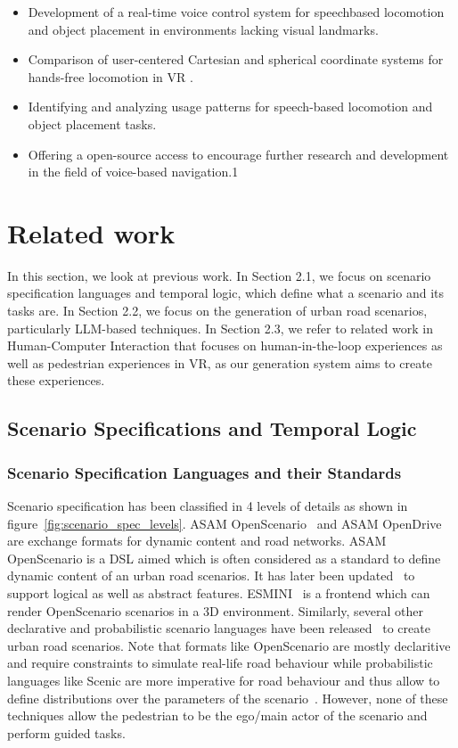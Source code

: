 \documentclass[preprint,12pt]{elsarticle}
\newcommand{\reftext}[1]{{\color{gray}#1}}   %
\begin{document}
\begin{itemize}
\item \reftext{Development of a real-time voice control system for speechbased locomotion and object placement in environments lacking visual landmarks.}
\item \reftext{Comparison of user-centered Cartesian and spherical coordinate systems for hands-free locomotion in VR .}
\item \reftext{Identifying and analyzing usage patterns for speech-based locomotion and object placement tasks.}
\item \reftext{Offering a open-source access to encourage further research and development in the field of voice-based navigation.1}
\end{itemize}

\section{Related work}

In this section, we look at previous work. In Section 2.1, we focus on scenario specification languages and temporal logic, which define what a scenario and its tasks are. In Section 2.2, we focus on the generation of urban road scenarios, particularly LLM-based techniques. In Section 2.3, we refer to related work in Human-Computer Interaction that focuses on human-in-the-loop experiences as well as pedestrian experiences in VR, as our generation system aims to create these experiences.

\subsection{Scenario Specifications and Temporal Logic}
\subsubsection{Scenario Specification Languages and their Standards}
Scenario specification has been classified in 4 levels of details as shown in figure~\ref{fig:scenario_spec_levels}. ASAM OpenScenario~\cite{asam_openscenario} and ASAM OpenDrive~\cite{todo} are exchange formats for dynamic content and road networks. ASAM OpenScenario is a DSL aimed which is often considered as a standard to define dynamic content of an urban road scenarios. It has later been updated~\cite{todo cite openscenario 2} to support logical as well as abstract features. ESMINI~\cite{todo cite esmini} is a frontend which can render OpenScenario scenarios in a 3D environment. Similarly, several other declarative and probabilistic scenario languages have been released~\cite{fremont2019scenic,vin2023scenic3,4JPQ8JTG,J3YJDXUH,VYKWQ4VL,YBT8TZBC,JMP3L7FI,SPU4TMNS,CB7JIPN2,todo cite geoscenario} to create urban road scenarios. Note that formats like OpenScenario are mostly declaritive and require constraints to simulate real-life road behaviour while probabilistic languages like Scenic are more imperative for road behaviour and thus allow to define distributions over the parameters of the scenario~\cite{molin2023specguided}. However, none of these techniques allow the pedestrian to be the ego/main actor of the scenario and perform guided tasks. 
\end{document}

